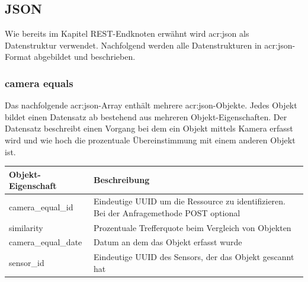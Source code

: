 \subsection{JSON}%
\label{sec:rest.json}
Wie bereits im Kapitel REST-Endknoten erwähnt wird \acrshort{acr:json} als Datenstruktur verwendet. Nachfolgend werden alle Datenstrukturen in \acrshort{acr:json}-Format abgebildet und beschrieben.

\subsubsection{camera equals}%
\label{sec:rest.json.camera_equals}
Das nachfolgende \acrshort{acr:json}-Array enthält mehrere \acrshort{acr:json}-Objekte. Jedes Objekt bildet einen Datensatz ab bestehend aus mehreren Objekt-Eigenschaften. Der Datensatz beschreibt einen Vorgang bei dem ein Objekt mittels Kamera erfasst wird und wie hoch die prozentuale Übereinstimmung mit einem anderen Objekt ist.

\begin{jsoncode}
\end{jsoncode}

\begin{table}[H]
  \begin{tabularx}{\textwidth}{lX}
    \textbf{Objekt-Eigenschaft} & \textbf{Beschreibung}                                                                     \\ \toprule
    camera\_equal\_id           & Eindeutige UUID um die Ressource zu identifizieren. Bei der Anfragemethode POST optional  \\
    similarity                  & Prozentuale Trefferquote beim Vergleich von Objekten                                      \\
    camera\_equal\_date         & Datum an dem das Objekt erfasst wurde                                                     \\
    sensor\_id                  & Eindeutige UUID des Sensors, der das Objekt gescannt hat                                  \\
  \end{tabularx}
\end{table}

